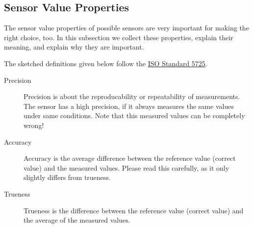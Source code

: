 \subsection{Sensor Value Properties}
\label{ssec:valuepropoerties}

The sensor value properties of possible sensors are very important for making the right choice, too. In this subsection we collect these properties, explain their meaning, and explain why they are important.

The sketched definitions given below follow the \href{https://en.wikipedia.org/wiki/Accuracy_and_precision#ISO_definition_.28ISO_5725.29}{ISO Standard 5725}.

\begin{description}
 \item [Precision] Precision is about the reproducability or repeatability of measurements. The sensor has a high precision, if it always measures the same values under same conditions. Note that this measured values can be completely wrong!
 \item [Accuracy] Accuracy is the average difference between the reference value (correct value) and the measured values. Please read this carefully, as it only slightly differs from trueness.
 \item [Trueness] Trueness is the difference between the reference value (correct value) and the average of the measured values.
\end{description}

